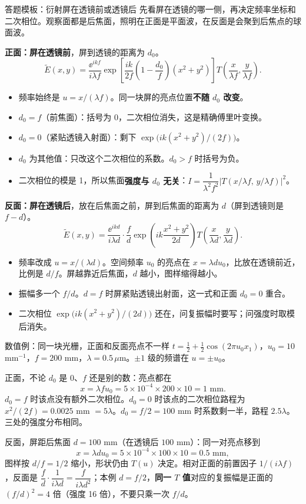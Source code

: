 \begin{exam}{答题模板：衍射屏在透镜前或透镜后}\label{ex:screenpos}
先看屏在透镜的哪一侧，再决定频率坐标和二次相位。观察面都是后焦面，照明在正面是平面波，在反面是会聚到后焦点的球面波。

\textbf{正面：屏在透镜前}，屏到透镜的距离为 $d_0$。
\[
\tilde E(x,y)=\frac{\ee^{ikf}}{i\lambda f}\exp\!\left[\frac{ik}{2f}\left(1-\frac{d_0}{f}\right)(x^2+y^2)\right]T\!\left(\frac{x}{\lambda f},\frac{y}{\lambda f}\right).
\]
\begin{itemize}
\item 频率始终是 $u=x/(\lambda f)$。同一块屏的亮点位置\textbf{不随 $d_0$ 改变}。
\item $d_0=f$（前焦面）：括号为 0，二次相位消失，这是精确傅里叶变换。
\item $d_0=0$（紧贴透镜入射面）：剩下 $\exp\!\big(ik(x^2+y^2)/(2f)\big)$。
\item $d_0$ 为其他值：只改这个二次相位的系数。$d_0>f$ 时括号为负。
\item 二次相位的模是 1，所以焦面\textbf{强度与 $d_0$ 无关}：$I=\dfrac{1}{\lambda^2f^2}\left|T(x/\lambda f,\,y/\lambda f)\right|^2$。
\end{itemize}

\textbf{反面：屏在透镜后}，放在后焦面之前，屏到后焦面的距离为 $d$（屏到透镜则是 $f-d$）。
\[
\tilde E(x,y)=\frac{\ee^{ikd}}{i\lambda d}\cdot\frac{f}{d}\exp\!\left(ik\frac{x^2+y^2}{2d}\right)T\!\left(\frac{x}{\lambda d},\frac{y}{\lambda d}\right).
\]
\begin{itemize}
\item 频率改成 $u=x/(\lambda d)$。空间频率 $u_0$ 的亮点在 $x=\lambda du_0$，比放在透镜前近，比例是 $d/f$。屏越靠近后焦面，$d$ 越小，图样缩得越小。
\item 振幅多一个 $f/d$。$d=f$ 时屏紧贴透镜出射面，这一式和正面 $d_0=0$ 重合。
\item 二次相位 $\exp\!\big(ik(x^2+y^2)/(2d)\big)$ 还在，问复振幅时要写；问强度时取模后消失。
\end{itemize}
\end{exam}

\begin{exam}{数值例：同一块光栅，正面和反面亮点不一样}
$t=\frac12+\frac12\cos(2\pi u_0 x_1)$，$u_0=10$ mm$^{-1}$，$f=200$ mm，$\lambda=0.5\,\mu$m。$\pm1$ 级的频谱在 $u=\pm u_0$。

正面，不论 $d_0$ 是 $0$、$f$ 还是别的数：亮点都在
\[
x=\lambda fu_0=5\times10^{-4}\times200\times10=1\text{ mm}.
\]
$d_0=f$ 时该点没有额外二次相位。$d_0=0$ 时该点的二次相位路程为 $x^2/(2f)=0.0025$ mm $=5\lambda$。$d_0=f/2=100$ mm 时系数剩一半，路程 $2.5\lambda$。三处的强度分布相同。

反面，屏距后焦面 $d=100$ mm（在透镜后 $100$ mm）：同一对亮点移到
\[
x=\lambda du_0=5\times10^{-4}\times100\times10=0.5\text{ mm},
\]
图样按 $d/f=1/2$ 缩小，形状仍由 $T(u)$ 决定。相对正面的前置因子 $1/(i\lambda f)$，反面是 $\dfrac{f}{d}\cdot\dfrac{1}{i\lambda d}=\dfrac{f}{i\lambda d^2}$；本例 $d=f/2$，\textbf{同一 $T$ 值}对应的复振幅是正面的 $(f/d)^2=4$ 倍（强度 16 倍），不要只乘一次 $f/d$。
\end{exam}

